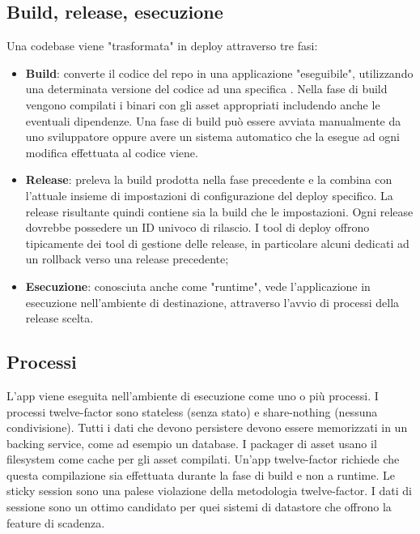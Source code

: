 \documentclass[PianoDiQualifica.tex]{subfiles}
\begin{document}
\subsection{Build, release, esecuzione}
Una codebase viene "trasformata" in deploy attraverso tre fasi:
\begin{itemize}
\item \textbf{Build}: converte il codice del repo in una applicazione "eseguibile", utilizzando una determinata versione del codice ad una specifica . Nella fase di build vengono compilati i binari con gli asset appropriati includendo anche le eventuali dipendenze. Una fase di build può essere avviata manualmente da uno sviluppatore oppure avere un sistema automatico che la esegue ad ogni modifica effettuata al codice viene.
\item \textbf{Release}: preleva la build prodotta nella fase precedente e la combina con l'attuale insieme di impostazioni di configurazione del deploy specifico. La release risultante quindi contiene sia la build che le impostazioni. Ogni release dovrebbe possedere un ID univoco di rilascio. I tool di deploy offrono tipicamente dei tool di gestione delle release, in particolare alcuni dedicati ad un rollback verso una release precedente;
\item \textbf{Esecuzione}: conosciuta anche come "runtime", vede l'applicazione in esecuzione nell'ambiente di destinazione, attraverso l'avvio di processi della release scelta.
\end{itemize}

\subsection{Processi}
L'app viene eseguita nell'ambiente di esecuzione come uno o più processi. I processi twelve-factor sono stateless (senza stato) e share-nothing (nessuna condivisione). Tutti i dati che devono persistere devono essere memorizzati in un backing service, come ad esempio un database.
I packager di asset usano il filesystem come cache per gli asset compilati. Un'app twelve-factor richiede che questa compilazione sia effettuata durante la fase di build e non a runtime.
Le sticky session sono una palese violazione della metodologia twelve-factor. I dati di sessione sono un ottimo candidato per quei sistemi di datastore che offrono la feature di scadenza.
\end{document}
